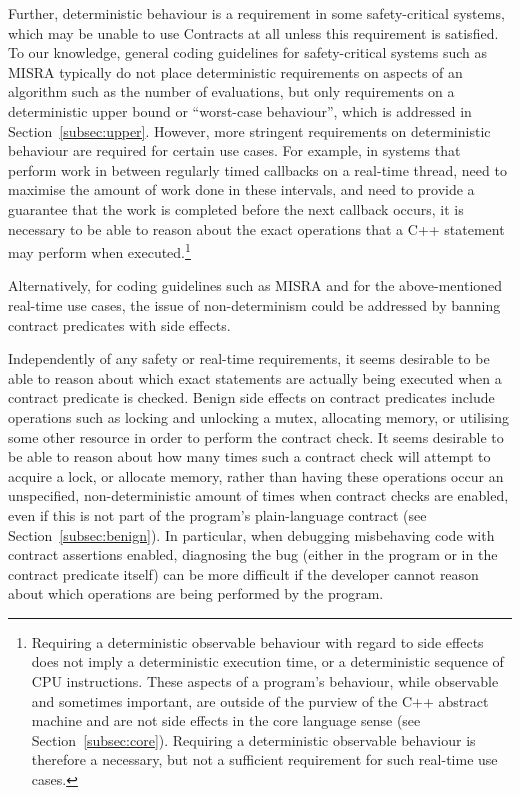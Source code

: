 Further, deterministic behaviour is a requirement in some safety-critical systems, which may be unable to use Contracts at all unless this requirement is satisfied.  To our knowledge, general coding guidelines for safety-critical systems such as MISRA typically do not place deterministic requirements on aspects of an algorithm such as the number of evaluations, but only requirements on a deterministic upper bound or ``worst-case behaviour'', which is addressed in Section~\ref{subsec:upper}. However, more stringent  requirements on deterministic behaviour are required for certain use cases. For example, in systems that perform work in between regularly timed callbacks on a real-time thread, need to maximise the amount of work done in these intervals, and need to provide a guarantee that the work is completed before the next callback occurs, it is necessary to be able to reason about the exact operations that a C++ statement may perform when executed.\footnote{Requiring a deterministic observable behaviour with regard to side effects does not imply a deterministic execution time, or a deterministic sequence of CPU instructions. These aspects of a program's behaviour, while observable and sometimes important, are outside of the purview of the C++ abstract machine and are not side effects in the core language sense (see Section~\ref{subsec:core}). Requiring a deterministic observable behaviour is therefore a necessary, but not a sufficient requirement for such real-time use cases.}

Alternatively, for coding guidelines such as MISRA and for the above-mentioned real-time use cases, the issue of non-determinism could be addressed by banning contract predicates with side effects.

Independently of any safety or real-time requirements, it seems desirable to be able to reason about which exact statements are actually being executed when a contract predicate is checked. Benign side effects on contract predicates include operations such as locking and unlocking a mutex, allocating memory, or utilising some other resource in order to perform the contract check. It seems desirable to be able to reason about how many times such a contract check will attempt to acquire a lock, or allocate memory, rather than having these operations occur an unspecified, non-deterministic amount of times when contract checks are enabled, even if this is not part of the program's plain-language contract (see Section~\ref{subsec:benign}). In particular, when debugging misbehaving code with contract assertions enabled, diagnosing the bug (either in the program or in the contract predicate itself) can be more difficult if the developer cannot reason about which operations are being performed by the program.

